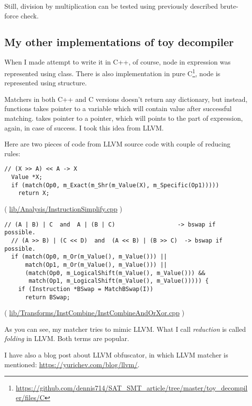 Still, division by multiplication can be tested using previously described brute-force check.

\subsection{My other implementations of toy decompiler}

When I made attempt to write it in C++, of course, node in expression was represented using class.
There is also implementation in pure C\footnote{\url{https://github.com/dennis714/SAT_SMT_article/tree/master/toy_decompiler/files/C}}, node is represented using structure.

Matchers in both C++ and C versions doesn't return any dictionary, but instead, 
functions takes pointer to a variable which will contain value after successful matching.
 takes pointer to a pointer, which will points to the part of expression, again, in case of success.
I took this idea from LLVM.

Here are two pieces of code from LLVM source code with couple of reducing rules:

\begin{lstlisting}
// (X >> A) << A -> X
  Value *X;
  if (match(Op0, m_Exact(m_Shr(m_Value(X), m_Specific(Op1)))))
    return X;
\end{lstlisting}

( \href{http://llvm.org/docs/doxygen/html/InstructionSimplify_8cpp_source.html}{lib/Analysis/InstructionSimplify.cpp} )

\begin{lstlisting}
// (A | B) | C  and  A | (B | C)                  -> bswap if possible.
  // (A >> B) | (C << D)  and  (A << B) | (B >> C)  -> bswap if possible.
  if (match(Op0, m_Or(m_Value(), m_Value())) ||
      match(Op1, m_Or(m_Value(), m_Value())) ||
      (match(Op0, m_LogicalShift(m_Value(), m_Value())) &&
       match(Op1, m_LogicalShift(m_Value(), m_Value())))) {
    if (Instruction *BSwap = MatchBSwap(I))
      return BSwap;
\end{lstlisting}
( \href{https://github.com/numba/llvm-mirror/blob/master/lib/Transforms/InstCombine/InstCombineAndOrXor.cpp}{lib/Transforms/InstCombine/InstCombineAndOrXor.cpp} )

As you can see, my matcher tries to mimic LLVM.
What I call \textit{reduction} is called \textit{folding} in LLVM.
Both terms are popular.

I have also a blog post about LLVM obfuscator, in which LLVM matcher is mentioned: \url{https://yurichev.com/blog/llvm/}.

